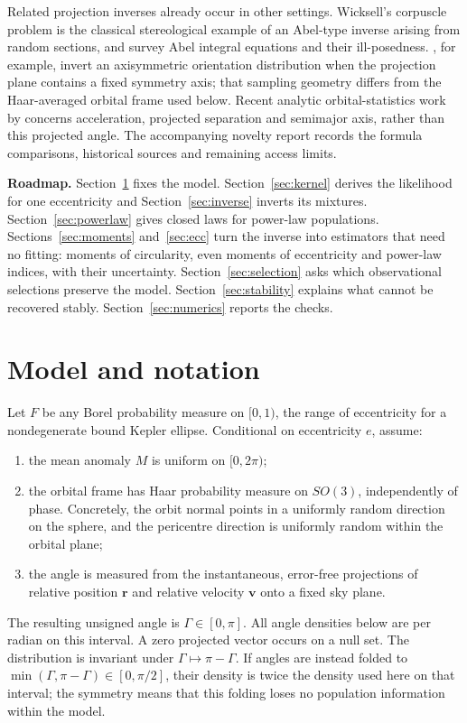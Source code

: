 \documentclass[11pt,a4paper]{article}
\theoremstyle{remark}\newtheorem{remark}[theorem]{Remark}
\begin{document}
Related projection inverses already occur in other settings. Wicksell's corpuscle problem \citep{Wicksell1925} is the classical stereological example of an Abel-type inverse arising from random sections, and \citet{GorenfloVessella1991} survey Abel integral equations and their ill-posedness. \citet{Kloza2023}, for example, invert an axisymmetric orientation distribution when the projection plane contains a fixed symmetry axis; that sampling geometry differs from the Haar-averaged orbital frame used below. Recent analytic orbital-statistics work by \citet{Brandt2026} concerns acceleration, projected separation and semimajor axis, rather than this projected angle. The accompanying novelty report records the formula comparisons, historical sources and remaining access limits.

\textbf{Roadmap.} Section~\ref{sec:model} fixes the model. Section~\ref{sec:kernel} derives the likelihood for one eccentricity and Section~\ref{sec:inverse} inverts its mixtures. Section~\ref{sec:powerlaw} gives closed laws for power-law populations. Sections~\ref{sec:moments} and~\ref{sec:ecc} turn the inverse into estimators that need no fitting: moments of circularity, even moments of eccentricity and power-law indices, with their uncertainty. Section~\ref{sec:selection} asks which observational selections preserve the model. Section~\ref{sec:stability} explains what cannot be recovered stably. Section~\ref{sec:numerics} reports the checks.

\section{Model and notation}\label{sec:model}

Let $F$ be any Borel probability measure on $[0,1)$, the range of eccentricity for a nondegenerate bound Kepler ellipse. Conditional on eccentricity $e$, assume:
\begin{enumerate}
\item the mean anomaly $M$ is uniform on $[0,2\pi)$;
\item the orbital frame has Haar probability measure on $SO(3)$, independently of phase. Concretely, the orbit normal points in a uniformly random direction on the sphere, and the pericentre direction is uniformly random within the orbital plane;
\item the angle is measured from the instantaneous, error-free projections of relative position $\bm r$ and relative velocity $\bm v$ onto a fixed sky plane.
\end{enumerate}
The resulting unsigned angle is $\Gamma\in[0,\pi]$. All angle densities below are per radian on this interval. A zero projected vector occurs on a null set. The distribution is invariant under $\Gamma\mapsto\pi-\Gamma$. If angles are instead folded to $\min(\Gamma,\pi-\Gamma)\in[0,\pi/2]$, their density is twice the density used here on that interval; the symmetry means that this folding loses no population information within the model.
\end{document}
